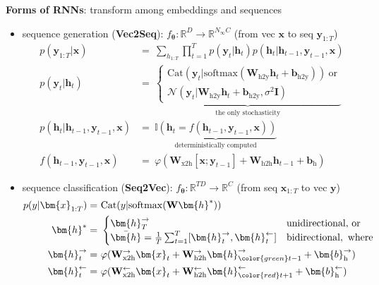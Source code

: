 \textbf{Forms of RNNs}: transform among embeddings and sequences
\begin{itemize}
    \item sequence generation (\textbf{Vec2Seq}): $f_{\bm{\theta}}:\mathbb{R}^D\to\mathbb{R}^{N_\infty C}$ (from vec $\bm{x}$ to seq $\bm{y}_{1:T}$)
    \begin{align}
        p(\bm{y}_{1:T}|\bm{x}) &=~ \sum_{h_{1:T}}\prod_{t=1}^Tp(\bm{y}_t|\bm{h}_t)p(\bm{h}_t|\bm{h}_{t-1},\bm{y}_{t-1},\bm{x}) \\
        p(\bm{y}_t|\bm{h}_t) &=~ \underbrace{\begin{cases}
        \mathrm{Cat}(\bm{y}_t|\mathrm{softmax}(\mathbf{W}_\text{h2y}\bm{h}_t+\bm{b}_\text{h2y})) ~\text{or}\\
        \mathcal{N}(\bm{y}_t|\mathbf{W}_\text{h2y}\bm{h}_t+\bm{b}_\text{h2y},\sigma^2\mathbf{I})
        \end{cases}}_\text{the only stochasticity}\\
        p(\bm{h}_t|\bm{h}_{t-1},\bm{y}_{t-1},\bm{x}) &=~ \underbrace{\mathbb{I}(\bm{h}_t = f(\bm{h}_{t-1},\bm{y}_{t-1},\bm{x}))}_\text{deterministically computed} \\
        f(\bm{h}_{t-1},\bm{y}_{t-1},\bm{x}) &=~ \varphi(\mathbf{W}_\text{x2h}[\bm{x};\bm{y}_{t-1}]+\mathbf{W}_\text{h2h}\bm{h}_{t-1}+\bm{b}_\text{h}) \label{eq:vec2seqh}
    \end{align}

    \item sequence classification (\textbf{Seq2Vec}): $f_{\bm{\theta}}:\mathbb{R}^{TD}\to\mathbb{R}^{C}$ (from seq $\bm{x}_{1:T}$ to vec $\bm{y}$)
    \begin{align}
        p(y|\bm{x}_{1:T}) 
        =&~ \mathrm{Cat}(y|\mathrm{softmax}(\mathbf{W}\bm{h}^*)) \\
        \bm{h}^*
        =&~ \begin{cases}
            \bm{h}^\rightarrow_T & \text{unidirectional, or} \\
            \Bar{\bm{h}} = \frac{1}{T}\sum_{t=1}^T[\bm{h}^\rightarrow_t,\bm{h}^\leftarrow_t] & \text{bidirectional},~\text{where}
        \end{cases}\\
        \bm{h}^\rightarrow_t =&~ \varphi(\mathbf{W}^\rightarrow_\text{x2h}\bm{x}_t + \mathbf{W}^\rightarrow_\text{h2h}\bm{h}^\rightarrow_{\color{green}t-1} + \bm{b}^\rightarrow_\text{h}) \label{eq:seq2vech1} \\
        \bm{h}^\leftarrow_t =&~ \varphi(\mathbf{W}^\leftarrow_\text{x2h}\bm{x}_t + \mathbf{W}^\leftarrow_\text{h2h}\bm{h}^\leftarrow_{\color{red}t+1} + \bm{b}^\leftarrow_\text{h}) \label{eq:seq2vech2}
    \end{align}
    

\end{itemize}
